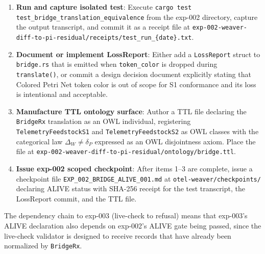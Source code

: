 \begin{enumerate}
    \item \textbf{Run and capture isolated test}: Execute
          \texttt{cargo test test\_bridge\_translation\_equivalence} from the
          exp-002 directory, capture the output transcript, and commit it as a
          receipt file at
          \texttt{exp-002-weaver-diff-to-pi-residual/receipts/test\_run\_\{date\}.txt}.

    \item \textbf{Document or implement LossReport}: Either add a \texttt{LossReport}
          struct to \texttt{bridge.rs} that is emitted when \texttt{token\_color} is
          dropped during \texttt{translate()}, or commit a design decision document
          explicitly stating that Colored Petri Net token color is out of scope for
          S1 conformance and its loss is intentional and acceptable.

    \item \textbf{Manufacture TTL ontology surface}: Author a TTL file declaring the
          \texttt{BridgeRx} translation as an OWL individual, registering
          \texttt{TelemetryFeedstockS1} and \texttt{TelemetryFeedstockS2} as OWL
          classes with the categorical law $\Delta_W \neq \delta_P$ expressed as an
          OWL disjointness axiom. Place the file at
          \texttt{exp-002-weaver-diff-to-pi-residual/ontology/bridge.ttl}.

    \item \textbf{Issue exp-002 scoped checkpoint}: After items 1--3 are complete,
          issue a checkpoint file \texttt{EXP\_002\_BRIDGE\_ALIVE\_001.md} at
          \texttt{otel-weaver/checkpoints/} declaring ALIVE status with SHA-256
          receipt for the test transcript, the LossReport commit, and the TTL file.
\end{enumerate}

The dependency chain to exp-003 (live-check to refusal) means that exp-003's ALIVE
declaration also depends on exp-002's ALIVE gate being passed, since the live-check
validator is designed to receive records that have already been normalized by
\texttt{BridgeRx}.
